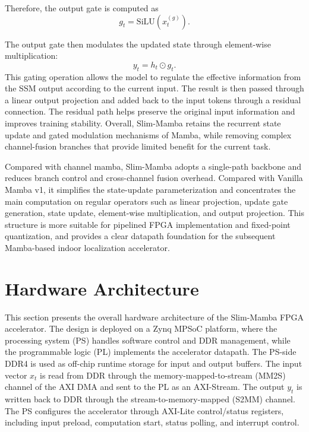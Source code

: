 \documentclass[11pt,twoside]{eitExjobb}
\makeatletter
\renewcommand\chapter{\clearpage\sh@chapter}
\makeatother
\begin{document}
Therefore, the output gate is computed as
\begin{equation}
g_t = \mathrm{SiLU}(x_t^{(g)}).
\label{eq:slim_mamba_output_gate}
\end{equation}

The output gate then modulates the updated state through element-wise multiplication:
\begin{equation}
y_t = h_t \odot g_t.
\label{eq:slim_mamba_output_modulation}
\end{equation}
This gating operation allows the model to regulate the effective information from the
SSM output according to the current input. The result is then passed through a linear
output projection and added back to the input tokens through a residual connection. The
residual path helps preserve the original input information and improves training
stability. Overall, Slim-Mamba retains the recurrent state update and gated modulation
mechanisms of Mamba, while removing complex channel-fusion branches that provide
limited benefit for the current task.

Compared with channel mamba, Slim-Mamba adopts a single-path backbone and reduces
branch control and cross-channel fusion overhead. Compared with Vanilla Mamba v1, it
simplifies the state-update parameterization and concentrates the main computation on
regular operators such as linear projection, update gate generation, state update,
element-wise multiplication, and output projection. This structure is more suitable for
pipelined FPGA implementation and fixed-point quantization, and provides a clear
datapath foundation for the subsequent Mamba-based indoor localization accelerator.


\chapter{Method}

\section{Hardware Architecture}
This section presents the overall hardware architecture of the Slim-Mamba FPGA
accelerator. The design is deployed on a Zynq MPSoC platform, where the processing
system (PS) handles software control and DDR management, while the programmable logic
(PL) implements the accelerator datapath. The PS-side DDR4 is used as off-chip runtime
storage for input and output buffers. The input vector $x_t$ is read from DDR through
the memory-mapped-to-stream (MM2S) channel of the AXI DMA and sent to the PL as an
AXI-Stream. The output $y_t$ is written back to DDR through the stream-to-memory-mapped
(S2MM) channel. The PS configures the accelerator through AXI-Lite control/status
registers, including input preload, computation start, status polling, and interrupt
control.
\end{document}
